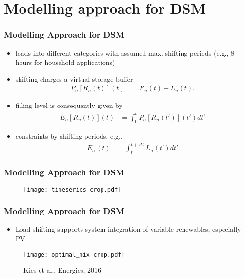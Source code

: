 \documentclass[10pt,dvipsnames]{beamer}
\let\olditem\item
\renewcommand{\item}{%
\olditem\vspace{5pt}}
\begin{document}
\section{Modelling approach for DSM}
\begin{frame}
 \frametitle{Modelling Approach for DSM}
  \begin{itemize}
  \item loads into different categories with assumed max. shifting periods (e.g., 8 hours for household applications)
  \item shifting charges a virtual storage buffer
  \begin{align}
 P_n[R_n(t)](t) &= R_n(t) - L_n(t).
\end{align}
\item filling level is consequently given by
\begin{align}
 E_n[R_n(t)](t) &= \int_0^t P_n[R_n(t')](t') dt'
\end{align}
\item constraints by shifting periods, e.g.,
\begin{align}
  E^{+}_n(t) &= \int_t^{t+\Delta t} L_n(t') dt'
\end{align}
 \end{itemize}

\end{frame}
\begin{frame}
\frametitle{Modelling Approach for DSM}
   \begin{figure}
  \begin{center}
 \texttt{[image: timeseries-crop.pdf]}
\end{center}

 \end{figure}
\end{frame}

\begin{frame}
\frametitle{Modelling Approach for DSM}
 \begin{itemize}
 \item Load shifting supports system integration of variable renewables, especially PV
 \end{itemize}
 \begin{figure}
  \begin{center}
\texttt{[image: optimal\_mix-crop.pdf]}
 \caption{Kies et al., Energies, 2016}
\end{center}

 \end{figure}
 \end{frame}
\end{document}
